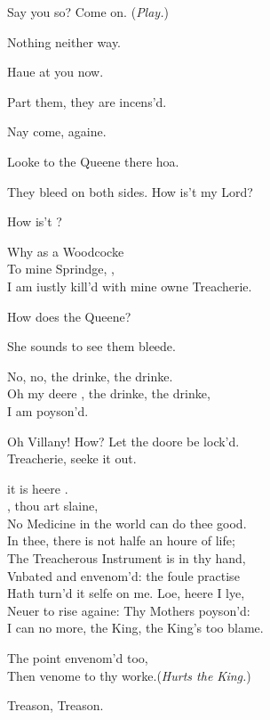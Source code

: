 \documentclass[a5paper,DIV=calc,11pt]{scrbook}
\begin{document}
\begin{drama*}
    \laerspeaks Say you so? Come on. \hfill(\textit{Play.})
    
    \osrspeaks Nothing neither way.
    
    \laerspeaks Haue at you now.
    
    
    \kingspeaks Part them, they are incens'd.
    
    \hamspeaks Nay come, againe.
    
    \osrspeaks Looke to the Queene there hoa.
    
    \horspeaks They bleed on both sides. How is't my Lord?
    
    \osrspeaks How is't \laer?
    
    \laerspeaks Why as a Woodcocke\\
    To mine Sprindge, \osr,\\
    I am iustly kill'd with mine owne Treacherie.
    
    \hamspeaks How does the Queene?
    
    \kingspeaks She sounds to see them bleede.
    
    \queenspeaks No, no, the drinke, the drinke.\\
    Oh my deere \ham, the drinke, the drinke,\\
    I am poyson'd.
    
    \hamspeaks Oh Villany! How? Let the doore be lock'd.\\
    Treacherie, seeke it out.
    
    \laerspeaks it is heere \ham.\\
    \ham, thou art slaine,\\
    No Medicine in the world can do thee good.\\
    In thee, there is not halfe an houre of life;\\
    The Treacherous Instrument is in thy hand,\\
    Vnbated and envenom'd: the foule practise\\
    Hath turn'd it selfe on me. Loe, heere I lye,\\
    Neuer to rise againe: Thy Mothers poyson'd:\\
    I can no more, the King, the King's too blame.
    
    \hamspeaks The point envenom'd too,\\
    Then venome to thy worke.\hfill(\textit{Hurts the King.})
    
     Treason, Treason.
    

\end{drama*}
\end{document}
